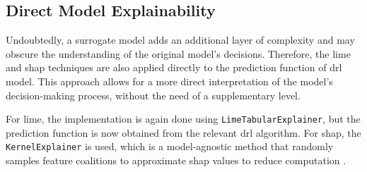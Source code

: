 \subsection{Direct Model Explainability} \label{subsec:direct_model_explainability}

Undoubtedly, a surrogate model adds an additional layer of complexity and may obscure the understanding of the original model's decisions. Therefore, the \acrshort{lime} and \acrshort{shap} techniques are also applied directly to the prediction function of \acrshort{drl} model. This approach allows for a more direct interpretation of the model's decision-making process, without the need of a supplementary level. 

For \acrshort{lime}, the implementation is again done using \texttt{LimeTabularExplainer}, but the prediction function is now obtained from the relevant \acrshort{drl} algorithm. For \acrshort{shap}, the \texttt{KernelExplainer} is used, which is a model-agnostic method that randomly samples feature coalitions to approximate \acrshort{shap} values to reduce computation \cite{ShapKernelExplainer}.
